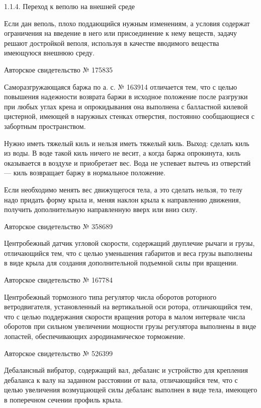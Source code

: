 1.1.4. Переход к веполю на внешней среде

Если  дан  веполь,  плохо  поддающийся нужным  изменениям,  а  условия
содержат  ограничения на  введение  в него  или  присоединение к  нему
веществ,  задачу  решают  достройкой   веполя,  используя  в  качестве
вводимого вещества имеющуюся внешнюю среду.

Авторское свидетельство № 175835

Саморазгружающаяся  баржа по  а. с.  №  163914 отличается  тем, что  с
целью повышения  надежности возврата баржи в  исходное положение после
разгрузки  при  любых углах  крена  и  опрокидывания она  выполнена  с
балластной килевой  цистерной, имеющей  в наружных  стенках отверстия,
постоянно сообщающиеся с забортным пространством.

Нужно иметь тяжелый  киль и нельзя иметь тяжелый  киль. Выход: сделать
киль  из воды.  В  воде такой  киль  ничего не  весит,  а когда  баржа
опрокинута,  киль оказывается  в воздухе  и приобретает  вес. Вода  не
успевает  вытечь из  отверстий —  киль возвращает  баржу в  нормальное
положение.

Если необходимо менять вес движущегося  тела, а это сделать нельзя, то
телу  надо придать  форму крыла  и, меняя  наклон крыла  к направлению
движения, получить дополнительную направленную вверх или вниз силу.

Авторское свидетельство № 358689

Центробежный датчик  угловой скорости,  содержащий двуплечие  рычаги и
грузы, отличающийся тем, что с целью уменьшения габаритов и веса грузы
выполнены в виде крыла для  создания дополнительной подъемной силы при
вращении.

Авторское свидетельство № 167784

Центробежный  тормозного  типа   регулятор  числа  оборотов  роторного
ветродвигателя, установленный на вертикальной оси ротора, отличающийся
тем,  что  с  целью  поддержания  скорости  вращения  ротора  в  малом
интервале  числа  оборотов  при   сильном  увеличении  мощности  грузы
регулятора выполнены в  виде лопастей, обеспечивающих аэродинамическое
торможение.

Авторское свидетельство № 526399

Дебалансный  вибратор,  содержащий  вал,  дебаланс  и  устройство  для
крепления   дебаланса  к   валу  на   заданном  расстоянии   от  вала,
отличающийся  тем, что  с целью  увеличения возмущающей  силы дебаланс
выполнен в виде тела, имеющего в поперечном сечении профиль крыла.

